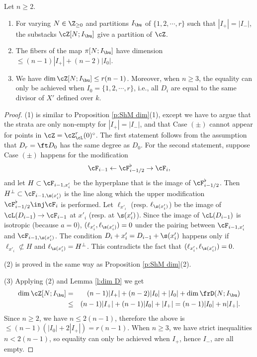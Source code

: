 \begin{prop}
\notready\label{p:dim ZL0} Let $n \geq 2$.
\begin{enumerate}
\item For varying $N\in \Z_{\ge0}$ and partitions $I_{\bu}$ of $\{1,2,\cdots, r\}$ such that $|I_{+}|=|I_{-}|$, the substacks  $\cZ[N;I_{\bu}]$ give a partition of $\cZ$.
\item The fibers of the map $\pi[N;I_{\bu}]$ have dimension $\le(n-1)|I_{+}|+(n-2)|I_{0}|$.
\item We have $\dim \cZ[N;I_{\bu}]\le r(n-1)$. Moreover, when $n\ge3$, the equality  can only be achieved when $I_{0}=\{1,2,\cdots, r\}$, i.e., all $D_{i}$ are equal to the same divisor of $X'$ defined over $k$.
\end{enumerate}
\end{prop}
\begin{proof}
(1) is similar to Proposition \ref{p:ShM dim}(1), except we have to argue that the strata are only non-empty for $|I_+|=|I_-|$, and that Case $(\pm)$ cannot appear for points in $\cZ=\cZ^{r}_{\cL}(0)^{\circ}$. The first statement follows from the assumption that $D_r = \ft D_0$ has the same degree as $D_0$. For the second statement, suppose Case $(\pm)$ happens for the modification
\[
\cF_{i-1}\leftarrow \cF_{i-1/2}^{\flat}\to \cF_{i},
\]
and let $H\subset \cF_{i-1,x'_{i}}$ be the hyperplane that is the image of $\cF_{i-1/2}^{\flat}$. Then $H^{\bot}\subset \cF_{i-1,\s(x'_{i})}$ is the line along which the upper modification $\cF_{i-1/2}^{\flat}\inj \cF_{i}$ is performed. Let $\ell_{x'_{i}}$ (resp. $\ell_{\s(x'_{i})}$) be the image of $\cL(D_{i-1})\to \cF_{i-1}$ at $x'_{i}$ (resp. at $\s(x'_{i})$). Since the image of $\cL(D_{i-1})$ is isotropic (because $a=0$), $(\ell_{x'_{i}},\ell_{\s(x'_{i})})=0$ under the pairing between $\cF_{i-1,x'_{i}}$ and $\cF_{i-1,\s(x'_{i})}$. The condition $D_{i}+x'_{i}=D_{i-1}+\s(x'_{i})$ happens only if $\ell_{x'_{i}}\not\subset H$ and $\ell_{\s(x'_{i})}=H^{\bot}$. This contradicts the fact that $(\ell_{x'_{i}},\ell_{\s(x'_{i})})=0$.

(2) is proved in the same way as Proposition \ref{p:ShM dim}(2).

(3) Applying (2) and Lemma \ref{l:dim D} we get
\begin{eqnarray*}
\dim\cZ[N;I_{\bu}]&=&  (n-1)|I_{+}|+(n-2)|I_{0}|+|I_{0}|+\dim \frD(N;I_{\bu})\\
&\le & (n-1)|I_{+}|+(n-1)|I_{0}|+|I_{+}|=(n-1)|I_{0}|+n|I_{+}|.
\end{eqnarray*}
Since $n\ge2$,  we have $n\le2(n-1)$, therefore the above is $\le (n-1)(|I_{0}|+2|I_{+}|)=r(n-1)$. When $n\ge3$, we have strict inequalities $n<2(n-1)$, so equality can only be achieved when $I_{+}$, hence $I_{-}$, are all empty.
\end{proof}




